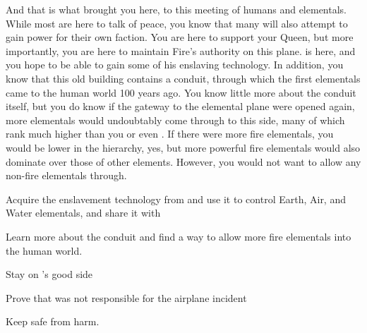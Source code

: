 \documentclass[char]{elementals}
\begin{document}
And that is what brought you here, to this meeting of humans and elementals.  While most are here to talk of peace, you know that many will also attempt to gain power for their own faction.  You are here to support your Queen, but more importantly, you are here to maintain Fire's authority on this plane.  \cMS{} is here, and you hope to be able to gain some of his enslaving technology.  In addition, you know that this old building contains a conduit, through which the first elementals came to the human world 100 years ago.  You know little more about the conduit itself, but you do know if the gateway to the elemental plane were opened again, more elementals would undoubtably come through to this side, many of which rank much higher than you or even \cQueen{}.  If there were more fire elementals, you would be lower in the hierarchy, yes, but more powerful fire elementals would also dominate over those of other elements.  However, you would not want to allow any non-fire elementals through.

\begin{itemz}[Goals]
  \item Acquire the enslavement technology from \cMS{} and use it to control Earth, Air, and Water elementals, and share it with \cQueen{}
  \item Learn more about the conduit and find a way to allow more fire elementals into the human world.
  \item Stay on \cQueen{}'s good side
  \item Prove that \cJuliet{} was not responsible for the airplane incident 
  \item Keep \cJuliet{} safe from harm.
\end{itemz}
\end{document}
